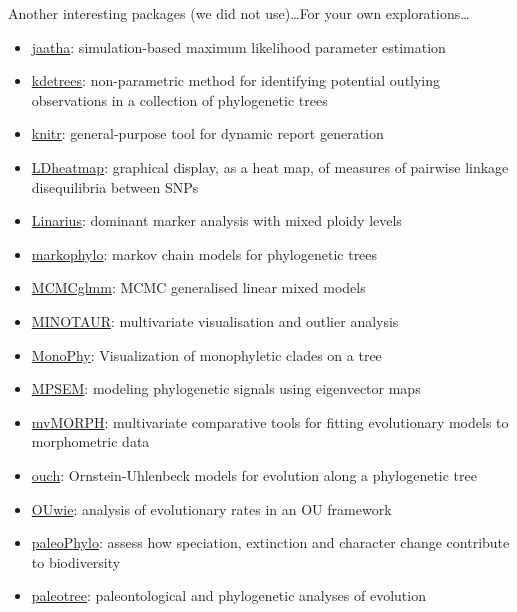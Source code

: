 \documentclass[compress, ucs, xelatex, 11pt, xcolor=svgnames,
  hyperref={
    bookmarks=true,
    unicode=true,
    colorlinks=true,
    pdftitle={Molecular data in R},
    plainpages=false,
    pdfauthor={Vojtech Zeisek},
    pdfsubject={Course about phylogeny and evolution in R},
    pdfcreator={XeLaTeX},
    pdfkeywords={R, evolution, phylogeny, molecular data},
    linkcolor=Tomato,
    anchorcolor=SaddleBrown,
    citecolor=Goldenrod,
    filecolor=DarkMagenta,
    menucolor=Sienna,
    urlcolor=DarkTurquoise,
    pdftex},
  url={hyphens, lowtilde} %
  ]{beamer}
\begin{document}
\begin{frame}[allowframebreaks]{Another interesting packages (we did not use)\ldots}{For your own explorations\ldots}
\begin{itemize}
    \item \href{https://cran.r-project.org/package=jaatha}{jaatha}: simulation-based maximum likelihood parameter estimation
    \item \href{https://cran.r-project.org/package=kdetrees}{kdetrees}: non-parametric method for identifying potential outlying observations in a collection of phylogenetic trees
    \item \href{https://cran.r-project.org/package=knitr}{knitr}: general-purpose tool for dynamic report generation
    \item \href{https://cran.r-project.org/package=LDheatmap}{LDheatmap}: graphical display, as a heat map, of measures of pairwise linkage disequilibria between SNPs
    \item \href{https://github.com/giby/Linarius}{Linarius}: dominant marker analysis with mixed ploidy levels
    \item \href{https://cran.r-project.org/package=markophylo}{markophylo}: markov chain models for phylogenetic trees
    \item \href{https://cran.r-project.org/package=MCMCglmm}{MCMCglmm}: MCMC generalised linear mixed models
    \item \href{https://github.com/NESCent/MINOTAUR}{MINOTAUR}: multivariate visualisation and outlier analysis
    \item \href{https://cran.r-project.org/web/packages/MonoPhy/vignettes/MonoPhyVignette.html}{MonoPhy}: Visualization of monophyletic clades on a tree
    \item \href{https://cran.r-project.org/package=MPSEM}{MPSEM}: modeling phylogenetic signals using eigenvector maps
    \item \href{https://cran.r-project.org/package=mvMORPH}{mvMORPH}: multivariate comparative tools for fitting evolutionary models to morphometric data
    \item \href{https://cran.r-project.org/package=ouch}{ouch}: Ornstein-Uhlenbeck models for evolution along a phylogenetic tree
    \item \href{https://cran.r-project.org/package=OUwie}{OUwie}: analysis of evolutionary rates in an OU framework
    \item \href{https://r-forge.r-project.org/projects/paleophylo/}{paleoPhylo}: assess how speciation, extinction and character change contribute to biodiversity
    \item \href{https://cran.r-project.org/package=paleotree}{paleotree}: paleontological and phylogenetic analyses of evolution

\end{itemize}
\end{frame}
\end{document}
